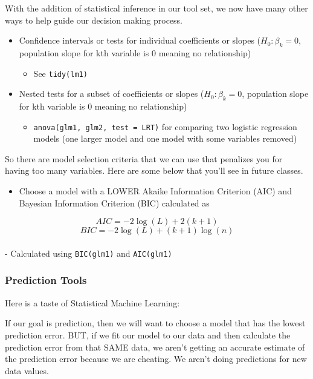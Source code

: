 \documentclass[
]{book}
\providecommand{\tightlist}{%
  \setlength{\itemsep}{0pt}\setlength{\parskip}{0pt}}
\begin{document}
With the addition of statistical inference in our tool set, we now have many other ways to help guide our decision making process.

\begin{itemize}
\tightlist
\item
  Confidence intervals or tests for individual coefficients or slopes (\(H_0: \beta_k = 0\), population slope for kth variable is 0 meaning no relationship)

  \begin{itemize}
  \tightlist
  \item
    See \texttt{tidy(lm1)}
  \end{itemize}
\item
  Nested tests for a subset of coefficients or slopes (\(H_0: \beta_k = 0\), population slope for kth variable is 0 meaning no relationship)

  \begin{itemize}
  \tightlist
  \item
    \texttt{anova(glm1,\ glm2,\ test\ =\ \textquotesingle{}LRT\textquotesingle{})} for comparing two logistic regression models (one larger model and one model with some variables removed)
  \end{itemize}
\end{itemize}

So there are model selection criteria that we can use that penalizes you for having too many variables. Here are some below that you'll see in future classes.

\begin{itemize}
\tightlist
\item
  Choose a model with a LOWER Akaike Information Criterion (AIC) and Bayesian Information Criterion (BIC) calculated as
\end{itemize}

\[AIC = -2\log(L) + 2(k+1)\]
\[BIC= -2\log(L) + (k+1)\log(n)\]\\
- Calculated using \texttt{BIC(glm1)} and \texttt{AIC(glm1)}

\hypertarget{prediction-tools}{%
\subsubsection{Prediction Tools}\label{prediction-tools}}

Here is a taste of Statistical Machine Learning:

If our goal is prediction, then we will want to choose a model that has the lowest prediction error. BUT, if we fit our model to our data and then calculate the prediction error from that SAME data, we aren't getting an accurate estimate of the prediction error because we are cheating. We aren't doing predictions for new data values.
\end{document}
